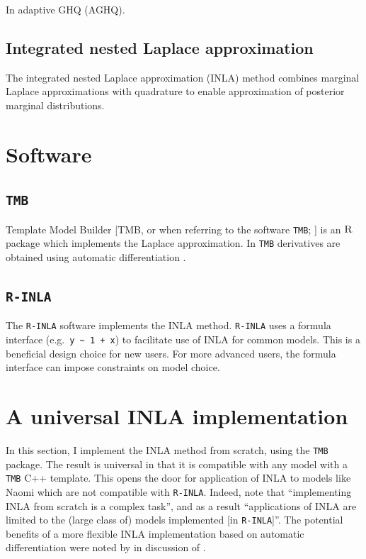 \documentclass[a4paper, nobind]{templates/ociamthesis}
\begin{document}
In adaptive GHQ (AGHQ).

\hypertarget{integrated-nested-laplace-approximation}{%
\subsection{Integrated nested Laplace approximation}\label{integrated-nested-laplace-approximation}}

The integrated nested Laplace approximation (INLA) method \autocite{rue2009approximate} combines marginal Laplace approximations with quadrature to enable approximation of posterior marginal distributions.

\hypertarget{software}{%
\section{Software}\label{software}}

\hypertarget{tmb}{%
\subsection{\texorpdfstring{\texttt{TMB}}{TMB}}\label{tmb}}

Template Model Builder {[}TMB, or when referring to the software \texttt{TMB}; \textcite{kristensen2016tmb}{]} is an \(\textsc{R}\) package which implements the Laplace approximation.
In \texttt{TMB} derivatives are obtained using automatic differentiation \autocite{baydin2017automatic}.

\hypertarget{r-inla}{%
\subsection{\texorpdfstring{\texttt{R-INLA}}{R-INLA}}\label{r-inla}}

The \texttt{R-INLA} software implements the INLA method.
\texttt{R-INLA} uses a formula interface (e.g.~\texttt{y\ \textasciitilde{}\ 1\ +\ x}) to facilitate use of INLA for common models.
This is a beneficial design choice for new users.
For more advanced users, the formula interface can impose constraints on model choice.

\hypertarget{a-universal-inla-implementation}{%
\section{A universal INLA implementation}\label{a-universal-inla-implementation}}

In this section, I implement the INLA method from scratch, using the \texttt{TMB} package.
The result is universal in that it is compatible with any model with a \texttt{TMB} C++ template.
This opens the door for application of INLA to models like Naomi which are not compatible with \texttt{R-INLA}.
Indeed, \textcite{martino2019integrated} note that ``implementing INLA from scratch is a complex task'', and as a result ``applications of INLA are limited to the (large class of) models implemented {[}in \texttt{R-INLA}{]}''.
The potential benefits of a more flexible INLA implementation based on automatic differentiation were noted by \textcite{skaug2009approximate} in discussion of \textcite{rue2009approximate}.
\end{document}
